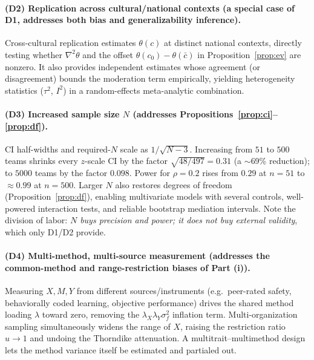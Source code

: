 \documentclass{amsart}
\theoremstyle{definition}
\begin{document}
\paragraph{(D2) Replication across cultural/national contexts (a special
case of D1, addresses both bias and generalizability inference).}
Cross-cultural replication estimates $\theta(c)$ at distinct national
contexts, directly testing whether
$\nabla^2\theta$ and the offset $\theta(c_0)-\theta(\bar c)$ in
Proposition~\ref{prop:ev} are nonzero. It also provides independent estimates
whose agreement (or disagreement) bounds the moderation term empirically,
yielding heterogeneity statistics ($\tau^2$, $I^2$) in a random-effects
meta-analytic combination.

\paragraph{(D3) Increased sample size $N$ (addresses
Propositions~\ref{prop:ci}--\ref{prop:df}).}
CI half-widths and required-$N$ scale as $1/\sqrt{N-3}$. Increasing
from $51$ to $500$ teams shrinks every $z$-scale CI by the factor
$\sqrt{48/497}=0.31$ (a $\sim$69\% reduction); to $5000$ teams by the factor
$0.098$. Power for $\rho=0.2$ rises from $0.29$ at $n=51$ to $\approx0.99$ at
$n=500$. Larger $N$ also restores degrees of freedom
(Proposition~\ref{prop:df}), enabling multivariate models with several
controls, well-powered interaction tests, and reliable bootstrap mediation
intervals. Note the division of labor: \emph{$N$ buys precision and power;
it does not buy external validity}, which only D1/D2 provide.

\paragraph{(D4) Multi-method, multi-source measurement (addresses the
common-method and range-restriction biases of Part (i)).}
Measuring $X,M,Y$ from different sources/instruments (e.g.\ peer-rated safety,
behaviorally coded learning, objective performance) drives the shared method
loading $\lambda$ toward zero, removing the
$\lambda_X\lambda_Y\sigma_f^2$ inflation term. Multi-organization sampling
simultaneously widens the range of $X$, raising the restriction ratio
$u\to1$ and undoing the Thorndike attenuation. A multitrait--multimethod
design lets the method variance itself be estimated and partialed out.
\end{document}

